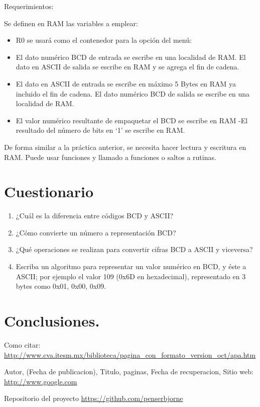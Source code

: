 \documentclass[a4paper,11pt]{article}                 %
\begin{document}
Requerimientos:

Se definen en RAM las variables a emplear:
\begin{itemize}
	\item R0 se usará como el contenedor para la opción del menú: 
	
	\item El dato numérico BCD de entrada se escribe en una localidad de RAM. El dato en ASCII de salida se escribe en RAM y se agrega el fin de cadena. 
	\item El dato en ASCII de entrada se escribe en máximo 5 Bytes en RAM ya incluido el fin de cadena. El dato numérico BCD de salida se escribe en una localidad de RAM.
	\item El valor numérico resultante de empaquetar el BCD se escribe en RAM -El resultado del número de bits en ‘1’ se escribe en RAM. 
\end{itemize}
De forma similar a la práctica anterior, se necesita hacer lectura y escritura en RAM. Puede usar funciones y llamado a funciones o saltos a rutinas.  


 


  
  \section{Cuestionario}
  
  \begin{enumerate}
  	 
  	
  	\item ¿Cuál es la diferencia entre códigos BCD y ASCII?

  	\item ¿Cómo convierte un número a representación BCD?

  	\item ¿Qué operaciones se realizan para convertir cifras BCD a ASCII y viceversa? 
  	
  	\item Escriba un algoritmo para representar un valor numérico en BCD, y éste a ASCII; por ejemplo el valor 109 (0x6D en hexadecimal), representado en 3 bytes como 0x01, 0x00, 0x09. 
  	  
  \end{enumerate}

\section{Conclusiones.}
  \begin{thebibliography}{}                           %
      Como citar: \url{http://www.cva.itesm.mx/biblioteca/pagina_con_formato_version_oct/apa.htm} %

      Autor,
      (Fecha de publicacion),
      Titulo, paginas,
      Fecha de recuperacion,
      Sitio web: \url{http://www.google.com}

      Repositorio del proyecto \url{https://github.com/penserbjorne}
  \end{thebibliography}

\end{document}
